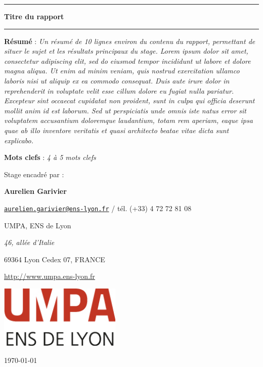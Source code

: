 \begin{center}

\vspace{1.5cm}

\rule[11pt]{5cm}{0.5pt}

\textbf{\huge Titre du rapport}

\rule{5cm}{0.5pt}

\vspace{1.5cm}

\parbox{15cm}{\small
\textbf{Résumé} : \it Un résumé de 10 lignes environ du contenu du rapport, permettant de situer le sujet et les résultats principaux du stage. Lorem ipsum dolor sit amet, consectetur adipiscing elit, sed do eiusmod tempor incididunt ut labore et dolore magna aliqua. Ut enim ad minim veniam, quis nostrud exercitation ullamco laboris nisi ut aliquip ex ea commodo consequat. Duis aute irure dolor in reprehenderit in voluptate velit esse cillum dolore eu fugiat nulla pariatur. Excepteur sint occaecat cupidatat non proident, sunt in culpa qui officia deserunt mollit anim id est laborum. Sed ut perspiciatis unde omnis iste natus error sit voluptatem accusantium doloremque laudantium, totam rem aperiam, eaque ipsa quae ab illo inventore veritatis et quasi architecto beatae vitae dicta sunt explicabo.
} %


\vspace{0.5cm}

\parbox{15cm}{
\textbf{Mots clefs} : \it 4 à 5 mots clefs
} %

\vspace{0.5cm}

\parbox{15cm}{
Stage encadré par :

{\bf Aurelien Garivier}

\href{mailto:aurelien.garivier@ens-lyon.fr}{\tt aurelien.garivier@ens-lyon.fr} / tél. (+33) 4 72 72 81 08

UMPA, ENS de Lyon

{\it 46, allée d’Italie

69364 Lyon Cedex 07, FRANCE}

\url{http://www.umpa.ens-lyon.fr}
} %

\vspace{1.5cm}

\includegraphics[height=3cm]{figures/logo_umpa.jpg}

\end{center}

\vfill
\hfill \today
